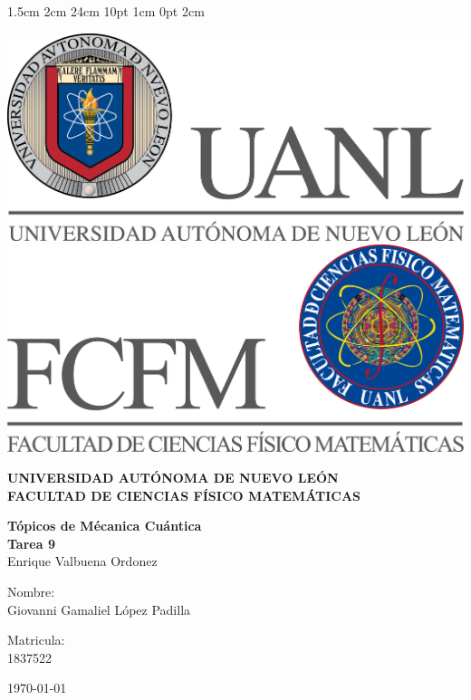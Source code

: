 \documentclass[12pt,letterpaper]{report}
\begin{document}
\setmargins{2.5cm}      
{1.5cm}                     
{2cm}  
{24cm}                    
{10pt}                          
{1cm}                          
{0pt}                             
{2cm}
\begin{titlepage}
\begin{center}
\includegraphics[scale=0.40]{../../Logos/uanl.png} 
\hspace{2.5cm}
\includegraphics[scale=0.40]{../../Logos/fcfm.png}
\end{center}
\vspace{2cm}
\begin{center}
\textbf{
UNIVERSIDAD AUTÓNOMA DE NUEVO LEÓN\\
FACULTAD DE CIENCIAS
    FÍSICO MATEMÁTICAS}\\
\vspace*{2cm}
\begin{large}
\vspace{1cm}
\large{\textbf{Tópicos de Mécanica Cuántica}}\\
\textbf{Tarea 9}\\
Enrique Valbuena Ordonez\\
\end{large}
\vspace{3.5cm}
\begin{minipage}{0.6\linewidth}
\vspace{0.5cm}
\changefontsizes{14pt}
Nombre:\\
Giovanni Gamaliel López Padilla\\
\end{minipage}
\begin{minipage}{0.2\linewidth}
\changefontsizes{14pt}
Matricula:\\
1837522
\end{minipage}
\end{center}
\vspace{4cm}
\begin{flushright}
\today
\end{flushright}
\end{titlepage}
\end{document}
